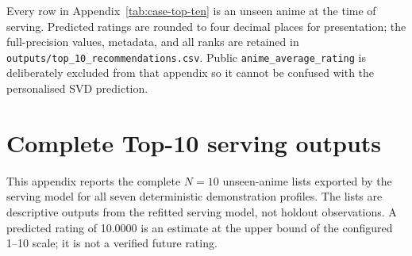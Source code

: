 \documentclass[12pt,a4paper]{article}
\begin{document}
Every row in Appendix~\ref{tab:case-top-ten} is an unseen anime at the time of serving. Predicted ratings are rounded to four decimal places for presentation; the full-precision values, metadata, and all ranks are retained in \texttt{outputs/top\_10\_recommendations.csv}. Public \texttt{anime\_average\_rating} is deliberately excluded from that appendix so it cannot be confused with the personalised SVD prediction.

\section{Complete Top-10 serving outputs}
This appendix reports the complete $N=10$ unseen-anime lists exported by the serving model for all seven deterministic demonstration profiles. The lists are descriptive outputs from the refitted serving model, not holdout observations. A predicted rating of 10.0000 is an estimate at the upper bound of the configured 1--10 scale; it is not a verified future rating.
\end{document}
